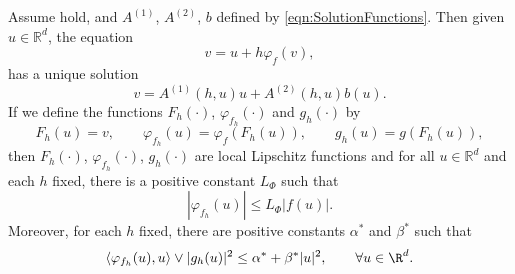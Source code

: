 \begin{thm}\label{lem:PhiFhProp}
	Assume  hold, and $A^{(1)}$, $A^{(2)}$, $b$  
	defined by 
	\eqref{eqn:SolutionFunctions}. Then given $u\in\mathbb{R}^d$, the equation
	\begin{equation}\label{eqn:varphiEquation}
		v = u + h \varphi_f(v),
	\end{equation}
	has a unique solution 
	\begin{equation}\label{eqn:varphiEqnSolution}
		v = A^{(1)}(h,u)u +A^{(2)}(h,u) b(u)	.
	\end{equation}
%
	If we define the functions
	$F_h(\cdot)$, $\varphi_{f_h}(\cdot)$ and $g_h(\cdot)$ by
	\begin{equation}\label{eqn:FunctionshDefinition}
		F_h(u) = v,
			\qquad 
			\varphi_{f_h}(u) =\varphi_{f}(F_h(u)),
			\qquad
			g_h(u) = g(F_h(u)),
	\end{equation}
	then $F_h(\cdot)$, $\varphi_{f_h}(\cdot)$, $g_h(\cdot)$ are local Lipschitz functions 
	and for all $u\in \mathbb{R}^d$ and each $h$ fixed, there is a positive constant $L_{\Phi}$ such that
	\begin{equation}\label{eqn:PhifhFbound}
		|\varphi_{f_h}(u)|\leq L_{\Phi} |f(u)|. 
	\end{equation} 
	Moreover, for each $h$ fixed,
	 there are positive constants $\alpha^*$ and  $\beta^*$ such that
	\begin{equation}\label{eqn:h-MonotoneCondition}
		\innerprod{\varphi_{f_h}(u)}{u} \vee |g_h(u)|^2 \leq \alpha^* + \beta^* |u|^2, 
		\qquad
		\forall u \in \R^d.
	\end{equation}
\end{thm}
%
